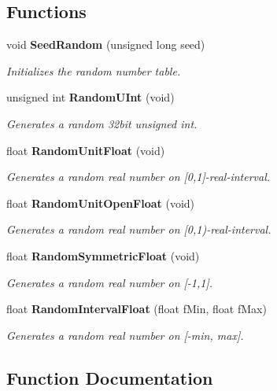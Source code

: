 \subsection*{Functions}
\begin{CompactItemize}
\item 
void {\bf Seed\-Random} (unsigned long seed)
\begin{CompactList}\small\item\em Initializes the random number table. \item\end{CompactList}\item 
unsigned int {\bf Random\-UInt} (void)
\begin{CompactList}\small\item\em Generates a random 32bit unsigned int. \item\end{CompactList}\item 
float {\bf Random\-Unit\-Float} (void)
\begin{CompactList}\small\item\em Generates a random real number on [0,1]-real-interval. \item\end{CompactList}\item 
float {\bf Random\-Unit\-Open\-Float} (void)
\begin{CompactList}\small\item\em Generates a random real number on [0,1)-real-interval. \item\end{CompactList}\item 
float {\bf Random\-Symmetric\-Float} (void)
\begin{CompactList}\small\item\em Generates a random real number on [-1,1]. \item\end{CompactList}\item 
float {\bf Random\-Interval\-Float} (float f\-Min, float f\-Max)
\begin{CompactList}\small\item\em Generates a random real number on [-min, max]. \item\end{CompactList}\end{CompactItemize}


\subsection{Function Documentation}
